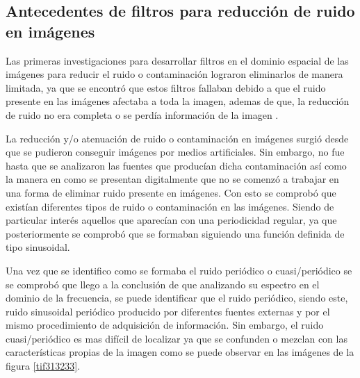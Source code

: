 \documentclass[10pt,letterpaper]{article}
\begin{document}
\subsection*{Antecedentes de filtros para reducción de ruido en imágenes}  
Las primeras investigaciones para desarrollar filtros en el dominio espacial de las imágenes para reducir el ruido o contaminación lograron eliminarlos de manera limitada, ya que se encontró que estos filtros fallaban debido a que el ruido presente en las imágenes afectaba a toda la imagen, ademas de que, la reducción de ruido no era completa o se perdía información de la imagen \cite{Fehr:Weiss}. %

La reducción y/o atenuación de ruido o contaminación en imágenes surgió desde que se pudieron conseguir imágenes por medios artificiales. Sin embargo, no fue hasta que se analizaron las fuentes que producían dicha contaminación así como la manera en como se presentan digitalmente que no se comenzó a trabajar en una forma de eliminar ruido presente en imágenes. Con esto se comprobó que existían diferentes tipos de ruido o contaminación en las imágenes. Siendo de particular interés aquellos que aparecían con una periodicidad regular, ya que posteriormente se comprobó que se formaban siguiendo una función definida de tipo sinusoidal.

Una vez que se identifico como se formaba el ruido periódico o cuasi/periódico se se comprobó que llego a la conclusión de que analizando su espectro en el dominio de la frecuencia, se puede identificar que el ruido periódico, siendo este, ruido sinusoidal periódico producido por  diferentes fuentes externas y por el mismo procedimiento de adquisición de información. Sin embargo, el ruido cuasi/periódico es mas difícil de localizar ya que se confunden o mezclan con las características propias de la imagen como se puede observar en las imágenes de la figura \ref{tif313233}.
\end{document}
